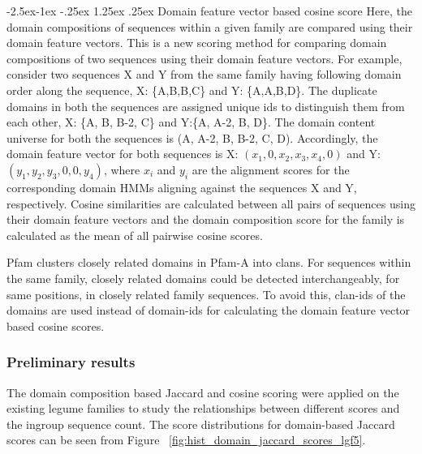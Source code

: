 \documentclass{article}
\makeatletter
\renewcommand\paragraph{\@startsection{paragraph}{4}{\z@}%
	{-2.5ex\@plus -1ex \@minus -.25ex}%
	{1.25ex \@plus .25ex}%
	{\normalfont\normalsize\bfseries}}
\makeatother
\begin{document}
		\paragraph{Domain feature vector based cosine score}
		Here, the domain compositions of sequences within a given family are compared using their domain feature vectors. This is a new scoring method for comparing domain compositions of two sequences using their domain feature vectors. For example, consider two sequences X and Y from the same family having following domain order along the sequence, X: \{A,B,B,C\} and Y: \{A,A,B,D\}. The duplicate domains in both the sequences are assigned unique ids to distinguish them from each other, X: \{A, B, B-2, C\} and Y:\{A, A-2, B, D\}. The domain content universe for both the sequences is (A, A-2, B, B-2, C, D). Accordingly, the domain feature vector for both sequences is X: $(x_{1}, 0, x_{2}, x_{3}, x_{4}, 0)$ and Y: $(y_{1}, y_{2}, y_{3}, 0, 0, y_{4})$, where $x_{i}$ and $y_{i}$ are the alignment scores for the corresponding domain HMMs aligning against the sequences X and Y, respectively. Cosine similarities are calculated between all pairs of sequences using their domain feature vectors and the domain composition score for the family is calculated as the mean of all pairwise cosine scores.
		
		Pfam clusters closely related domains in Pfam-A into clans. For sequences within the same family, closely related domains could be  detected interchangeably, for same positions, in closely related family sequences. To avoid this, clan-ids of the domains are used instead of domain-ids for calculating the domain feature vector based cosine scores.
		
		\subsubsection{Preliminary results}
		The domain composition based Jaccard and cosine scoring were applied on the existing legume families to study the relationships between different scores and the ingroup sequence count. The score distributions for domain-based Jaccard scores can be seen from Figure ~\ref{fig:hist_domain_jaccard_scores_lgf5}.
		
\end{document}
